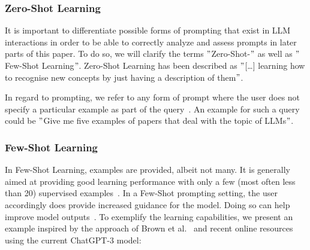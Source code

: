 \subsubsection{Zero-Shot Learning} %
It is important to differentiate possible forms of prompting that exist in LLM interactions in order
to be able to correctly analyze and assess prompts in later parts of this paper.
To do so, we will clarify the terms \("\)Zero-Shot-\("\) as well as \("\)Few-Shot Learning\("\).
Zero-Shot Learning has been described as \("\)[\ldots] learning how to recognise
new concepts by just having a description of them\("\)\cite[p. 1]{feris_embarrassingly_2015}.

In regard to prompting, we refer to any form of prompt where the user does not specify
a particular example as part of the query~\cite[p. 1]{dang_how_2022}.
An example for such a query could be \("\)Give me five examples of papers that deal with the topic
of LLMs\("\).

\subsubsection{Few-Shot Learning}
In Few-Shot Learning, examples are provided, albeit not many.
It is generally aimed at providing good learning performance with only a few (most often less than 20)
supervised examples~\cite[p. 1]{samuel_offline_2022}. %
In a Few-Shot prompting setting, the user accordingly does provide increased guidance for the model.
Doing so can help improve model outputs~\cite[p. 1]{dang_how_2022}.
To exemplify the learning capabilities, we present an example inspired by the approach of Brown et al\(.\)~\cite{brown_language_2020}
and recent online resources~\cite{dairai_few-shot_2023} using the current ChatGPT-3 model:

